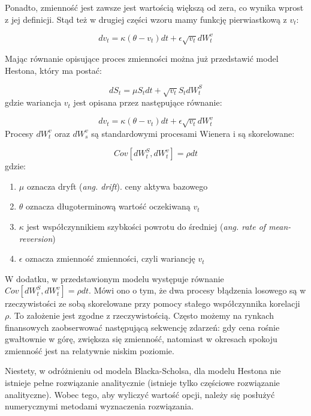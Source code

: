 \documentclass{pracamgr}
\begin{document}
Ponadto, zmienność jest zawsze jest wartością większą od zera, co wynika wprost z jej definicji. Stąd też w drugiej części wzoru mamy funkcję pierwiastkową z $v_t$: 

\begin{equation} 
dv_t  = \kappa (\theta - v_t)dt + \epsilon \sqrt{v_t} dW_t^v 
\end{equation}

Mając równanie opisujące proces zmienności można już przedstawić model Hestona, który ma postać:

\begin{equation}
dS_t  = \mu S_t dt + \sqrt{v_t} S_t dW^S_t
\end{equation}
gdzie wariancja $v_t$ jest opisana przez następujące równanie: 

\begin{equation}
dv_t  = \kappa (\theta - v_t)dt + \epsilon \sqrt{v_t} dW_t^v 
\end{equation}
Procesy $dW_t^v$ oraz $dW_s^v$ są standardowymi procesami Wienera i są skorelowane:

\begin{equation}
Cov[dW^S_t, dW^v_t] = \rho dt 
\end{equation}
gdzie:

\begin{enumerate}
\item $\mu$ oznacza dryft (\textit{ang. drift}). ceny aktywa bazowego 
\item $\theta$ oznacza długoterminową wartość oczekiwaną $v_t$
\item $\kappa$ jest współczynnikiem szybkości powrotu do średniej (\textit{ang. rate of mean-reversion})
\item $\epsilon$ oznacza zmienność zmienności, czyli wariancję $v_t$
\end{enumerate}

W dodatku, w przedstawionym modelu występuje równanie $Cov[dW^S_t, dW^v_t] = \rho dt $. Mówi ono o tym, że 
dwa procesy błądzenia losowego są w rzeczywistości ze sobą skorelowane przy pomocy stałego współczynnika 
korelacji $\rho$.
To założenie jest zgodne z rzeczywistością. Często możemy na rynkach finansowych zaobserwować następującą sekwencję zdarzeń: gdy cena rośnie gwałtownie w górę, zwiększa się zmienność, 
natomiast w okresach spokoju zmienność jest na relatywnie niskim poziomie.

Niestety, w odróżnieniu od modela Blacka-Scholsa, dla modelu Hestona nie istnieje pełne rozwiązanie analitycznie (istnieje tylko częściowe rozwiązanie analityczne). Wobec tego, aby 
wyliczyć wartość opcji, należy się posłużyć numerycznymi metodami wyznaczenia rozwiązania.
\end{document}
